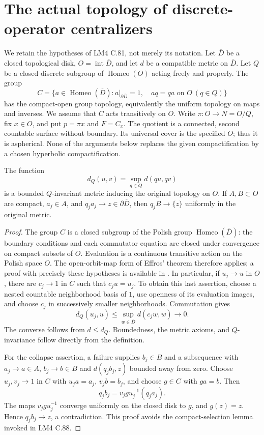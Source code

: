 \section{The actual topology of discrete-operator centralizers}
\label{sec:D}

We retain the hypotheses of LM4 C.81, not merely its notation.  Let
$\overline D$ be a closed topological disk, $O=\operatorname{int}\overline D$,
and let $d$ be a compatible metric on $\overline D$.  Let $Q$ be a closed
discrete subgroup of $\operatorname{Homeo}(O)$ acting freely and properly.
The group
\[
 C=\{a\in\operatorname{Homeo}(\overline D):
 a|_{\partial\overline D}=1,\quad aq=qa\text{ on }O\ (q\in Q)\}
\]
has the compact-open group topology, equivalently the uniform topology
on maps and inverses.  We assume that $C$ acts transitively on $O$.
Write $\pi:O\to N=O/Q$, fix $x\in O$, and put $p=\pi x$ and
$F=C_x$.  The quotient is a connected, second countable surface without
boundary.  Its universal cover is the specified $O$; thus it is
aspherical.  None of the arguments below replaces the given
compactification by a chosen hyperbolic compactification.

The function
\[
 d_Q(u,v)=\sup_{q\in Q}d(qu,qv)
\]
is a bounded $Q$-invariant metric inducing the original topology on $O$.
If $A,B\subset O$ are compact, $a_j\in A$, and
$q_ja_j\to z\in\partial\overline D$, then $q_jB\to\{z\}$ uniformly
in the original metric.
\begin{proof}
The group $C$ is a closed subgroup of the Polish group
$\operatorname{Homeo}(\overline D)$: the boundary conditions and each
commutator equation are closed under convergence on compact subsets of
$O$.  Evaluation is a continuous transitive action on the Polish space
$O$.  The open-orbit-map form of Effros' theorem therefore applies;
a proof with precisely these hypotheses is available in
\cite[Theorem 4.1]{DE_Wengenroth2025}.  In particular, if $u_j\to u$ in
$O$, there are $c_j\to1$ in $C$ such that $c_ju=u_j$.  To obtain this
last assertion, choose a nested countable neighborhood basis of $1$,
use openness of its evaluation images, and choose $c_j$ in successively
smaller neighborhoods.  Commutation gives
\[
 d_Q(u_j,u)\leq\sup_{w\in\overline D}d(c_jw,w)\longrightarrow0.
\]
The converse follows from $d\leq d_Q$.  Boundedness, the metric axioms,
and $Q$-invariance follow directly from the definition.

For the collapse assertion, a failure supplies $b_j\in B$ and a
subsequence with $a_j\to a\in A$, $b_j\to b\in B$ and
$d(q_jb_j,z)$ bounded away from zero.  Choose $u_j,v_j\to1$ in $C$
with $u_ja=a_j$, $v_jb=b_j$, and choose $g\in C$ with $ga=b$.
Then
\[
 q_jb_j=v_jg u_j^{-1}(q_ja_j).
\]
The maps $v_jg u_j^{-1}$ converge uniformly on the closed disk to $g$,
and $g(z)=z$.  Hence $q_jb_j\to z$, a contradiction.  This proof
avoids the compact-selection lemma invoked in LM4 C.88.
\end{proof}

